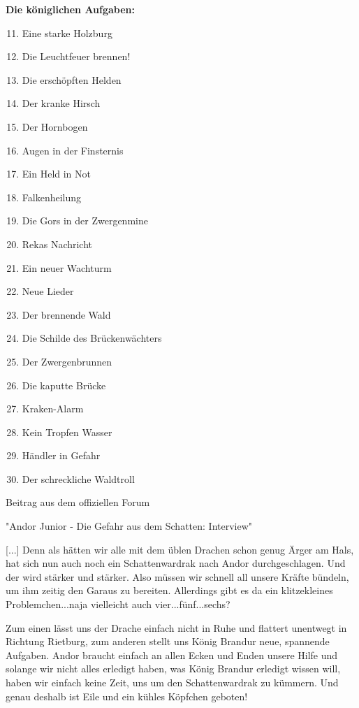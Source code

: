 \documentclass[10pt, a4paper, oneside]{book}
\begin{document}
\begin{multicols}{2}
\textbf{Die königlichen Aufgaben:}


\begin{enumerate}[topsep=0pt,itemsep=-1ex,partopsep=1ex,parsep=1ex]
    \setcounter{enumi}{10}
    \item Eine starke Holzburg
    \item Die Leuchtfeuer brennen!
    \item Die erschöpften Helden
    \item Der kranke Hirsch
    \item Der Hornbogen
    \item Augen in der Finsternis
    \item Ein Held in Not
    \item Falkenheilung
    \item Die Gors in der Zwergenmine
    \item Rekas Nachricht
    \item Ein neuer Wachturm
    \item Neue Lieder
    \item Der brennende Wald
    \item Die Schilde des Brückenwächters
    \item Der Zwergenbrunnen
    \item Die kaputte Brücke
    \item Kraken-Alarm
    \item Kein Tropfen Wasser
    \item Händler in Gefahr
    \item Der schreckliche Waldtroll
\end{enumerate}
 

\begin{center}
    Beitrag aus dem offiziellen Forum

    "Andor Junior - Die Gefahr aus dem Schatten: Interview"
\end{center}

[...] Denn als hätten wir alle mit dem üblen Drachen schon genug Ärger am Hals, hat sich nun auch noch ein Schattenwardrak nach Andor durchgeschlagen. Und der wird stärker und stärker. Also müssen wir schnell all unsere Kräfte bündeln, um ihm zeitig den Garaus zu bereiten. Allerdings gibt es da ein klitzekleines Problemchen...naja vielleicht auch vier...fünf...sechs?

Zum einen lässt uns der Drache einfach nicht in Ruhe und flattert unentwegt in Richtung Rietburg, zum anderen stellt uns König Brandur neue, spannende Aufgaben. Andor braucht einfach an allen Ecken und Enden unsere Hilfe und solange wir nicht alles erledigt haben, was König Brandur erledigt wissen will, haben wir einfach keine Zeit, uns um den Schattenwardrak zu kümmern. Und genau deshalb ist Eile und ein kühles Köpfchen geboten!


\end{multicols}
\end{document}
